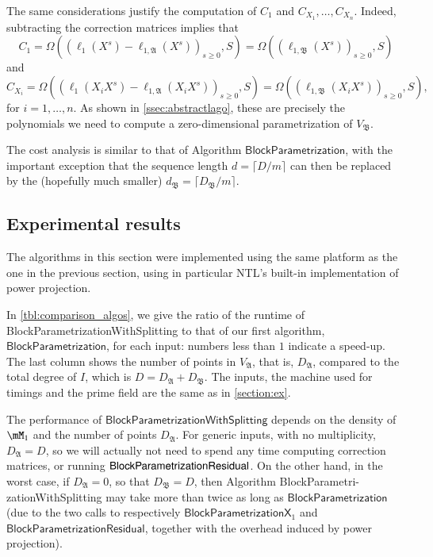 \documentclass[final,1p,times,authoryear]{elsarticle}
\newcommand{\mainalgoname}{\mathsf{ BlockParametrization}}
\newcommand{\lf}{X}
\begin{document}
The same considerations justify the computation of $C_1$ and
$C_{X_1},\dots,C_{X_n}$. Indeed, subtracting the correction matrices
implies that 
$$C_1 = \Omega( (\ell_1(\lf^s)-\ell_{1,\mathfrak{A}}(\lf^s))_{s \ge 0}, S) =  \Omega( (\ell_{1,\mathfrak{B}}(\lf^s))_{s \ge 0}, S)$$
and
$$C_{X_i} = \Omega( (\ell_1(X_i \lf^s)-\ell_{1,\mathfrak{A}}(X_i \lf^s))_{s \ge 0}, S) =  \Omega( (\ell_{1,\mathfrak{B}}(X_i\lf^s))_{s \ge 0}, S),$$
for $i=1,\dots,n$. As shown in \cref{ssec:abstractlago}, these are precisely 
the polynomials we need to compute a zero-dimensional parametrization
of $V_\mathfrak{B}$.

The cost analysis is similar to that of Algorithm $\mainalgoname$,
with the important exception that the sequence length $d=\lceil
D/m\rceil$ can then be replaced by the (hopefully much smaller)
$d_\mathfrak{B}=\lceil D_\mathfrak{B}/m\rceil$.



\subsection{Experimental results}

The algorithms in this section were implemented using the same
platform as the one in the previous section, using in particular NTL's
built-in implementation of power projection.

In \cref{tbl:comparison_algos}, we give the ratio of the runtime of
{\sf Block\-Parametrization\-WithSplitting} to that of our first
algorithm, $\mainalgoname$, for each input: numbers less than $1$
indicate a speed-up.  The last column shows the number of points in
$V_\mathfrak{A}$, that is, $D_\mathfrak{A}$, compared to the total
degree of $I$, which is $D=D_\mathfrak{A}+D_\mathfrak{B}$. The inputs,
the machine used for timings and the prime field are the same as in
\cref{section:ex}.

The performance of $\mathsf{BlockParametrizationWithSplitting}$
depends on the density of $\mM_1$ and the number of points
$D_\mathfrak{A}$.  For generic inputs, with no multiplicity,
$D_\mathfrak{A}=D$, so we will actually not need to spend any time
computing correction matrices, or running $\mainalgoname{\sf
Residual}$. On the other hand, in the worst case, if
$D_\mathfrak{A}=0$, so that $D_\mathfrak{B}=D$, then Algorithm
{\sf BlockParametri}-{\sf zationWithSplitting} may take more than twice as
long as $\mainalgoname$ (due to the two calls to respectively
$\mathsf{BlockParametrizationX}_1$ and
$\mathsf{BlockParametrizationResidual}$, together with the overhead induced 
by power projection).
\end{document}
